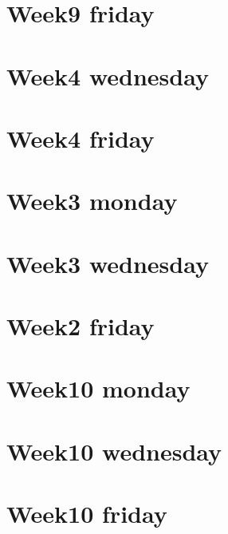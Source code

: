 
\section*{Week9 friday}

\vfill
\section*{Week4 wednesday}

\vfill
\section*{Week4 friday}

\vfill
\section*{Week3 monday}

\vfill
\section*{Week3 wednesday}

\vfill
\section*{Week2 friday}

\vfill
\section*{Week10 monday}

\vfill
\section*{Week10 wednesday}

\vfill
\section*{Week10 friday}

\vfill
